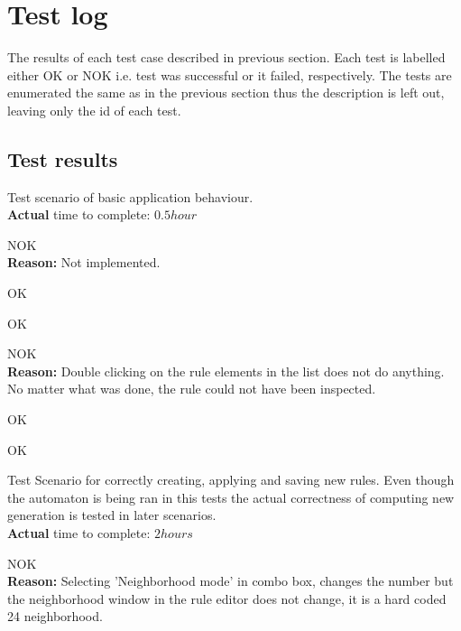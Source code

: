 \documentclass{article}
\begin{document}
\section{Test log}
The results of each test case described in previous section. Each test is labelled either {\color{green}OK} or {\color{red}NOK} i.e. test was successful or it failed, respectively. The tests are enumerated the same as in the previous section thus the 
description is left out, leaving only the id of each test.

\subsection{Test results}
\begin{legal}
	\item Test scenario of basic application behaviour.
	\\ {\bf Actual} time to complete: $0.5 hour$
	\begin{legal}
		\item {\color{red}NOK}
		\\{\bf Reason:} Not implemented.
		
		\item {\color{green}OK}
		
		\item {\color{green}OK}

		\item {\color{red}NOK}
		\\{\bf Reason:}
		Double clicking on the rule elements in the list does not do anything.
		No matter what was done, the rule could not have been inspected.

		\item {\color{green}OK}
		
		\item {\color{green}OK}

	\end{legal}
	
	
	\item Test Scenario for correctly creating, applying and saving new rules.
	Even though the automaton is being ran in this tests the actual correctness of computing new generation is tested in later scenarios.
	\\ {\bf Actual} time to complete: $2 hours$
		
	\begin{legal} 
		\item {\color{red}NOK}
 		\\{\bf Reason:} Selecting 'Neighborhood mode' in combo box, changes the number but the neighborhood window in the rule editor does not change, it is a hard coded 24 neighborhood.
		

\end{legal}
\end{legal}
\end{document}
